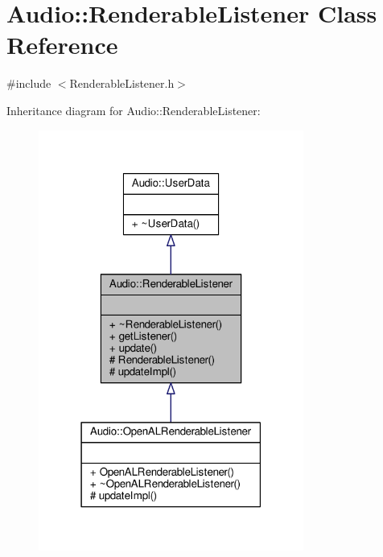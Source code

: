 \hypertarget{classAudio_1_1RenderableListener}{}\section{Audio\+:\+:Renderable\+Listener Class Reference}
\label{classAudio_1_1RenderableListener}


{\ttfamily \#include $<$Renderable\+Listener.\+h$>$}



Inheritance diagram for Audio\+:\+:Renderable\+Listener\+:
\nopagebreak
\begin{figure}[H]
\begin{center}
\leavevmode
\includegraphics[width=247pt]{d5/d98/classAudio_1_1RenderableListener__inherit__graph}
\end{center}
\end{figure}


